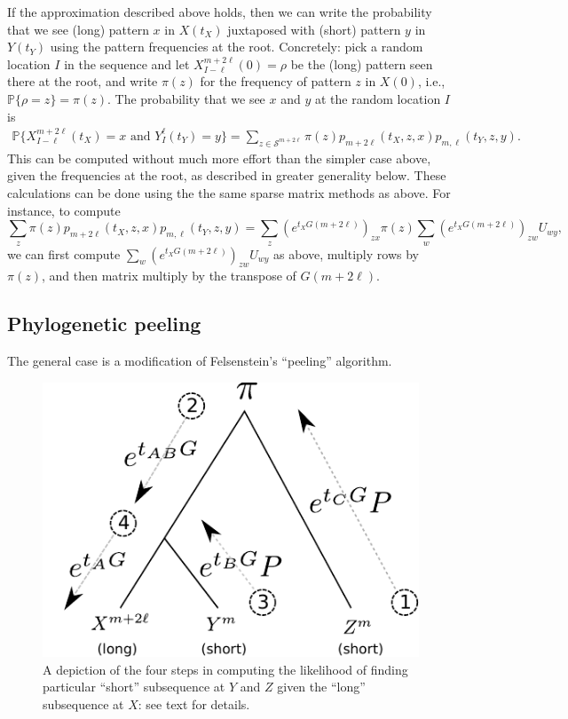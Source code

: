 \documentclass{article}
\renewcommand{\P}{\mathbb{P}}
\newcommand{\calS}{\mathcal{S}}  %
\theoremstyle{plain}
\theoremstyle{definition}
\begin{document}
If the approximation described above holds,
then we can write the probability that we see (long) pattern $x$ in $X(t_X)$ juxtaposed with (short) pattern $y$ in $Y(t_Y)$
using the pattern frequencies at the root.
Concretely: pick a random location $I$ in the sequence and let $X_{I-\ell}^{m+2\ell}(0) = \rho$ be the (long) pattern seen there at the root,
and write $\pi(z)$ for the frequency of pattern $z$ in $X(0)$, i.e., $\P\{\rho=z\}=\pi(z)$.
The probability that we see $x$ and $y$ at the random location $I$ is
\begin{align} \label{eqn:phylo_likelihood}
    \P\{X_{I-\ell}^{m+2\ell}(t_X)=x \text{ and } Y_I^\ell(t_Y)=y \} = \sum_{z \in \calS^{m+2\ell}} \pi(z) p_{m+2\ell}(t_X,z,x) p_{m,\ell}(t_Y,z,y) .
\end{align}
This can be computed without much more effort than the simpler case above,
given the frequencies at the root, as described in greater generality below.
These calculations can be done using the the same sparse matrix methods as above.
For instance, to compute
\[
    \sum_z \pi(z) p_{m+2\ell}(t_X,z,x) p_{m,\ell}(t_Y,z,y)
    = \sum_z \left( e^{t_X G(m+2\ell)} \right)_{zx} \pi(z) \sum_w \left( e^{t_X G(m+2\ell)} \right)_{zw} U_{wy} ,
\]
we can first compute $\sum_w \left( e^{t_X G(m+2\ell)} \right)_{zw} U_{wy}$ as above,
multiply rows by $\pi(z)$, and then matrix multiply by the transpose of $G(m+2\ell)$.


\subsection{Phylogenetic peeling}

The general case is a modification of Felsenstein's ``peeling'' algorithm.

\begin{figure}
    \begin{center}
    \includegraphics{peeling-schematic}
    \end{center}
    \caption{
        A depiction of the four steps in computing the likelihood of finding particular ``short'' subsequence at $Y$ and $Z$
        given the ``long'' subsequence at $X$: see text for details.
        \label{fig:peeling}
    }
\end{figure}
\end{document}
